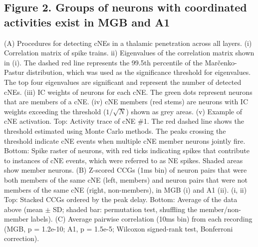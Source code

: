 \documentclass[11pt]{article}
\begin{document}
\subsection*{Figure 2. Groups of neurons with coordinated activities exist in MGB and A1}
(A) Procedures for detecting cNEs in a thalamic penetration across all layers. (i) Correlation matrix of spike trains. ii) Eigenvalues of the correlation matrix shown in (i). The dashed red line represents the 99.5th percentile of the Marčenko-Pastur distribution, which was used as the significance threshold for eigenvalues. The top four eigenvalues are significant and represent the number of detected cNEs. (iii) IC weights of neurons for each cNE. The green dots represent neurons that are members of a cNE. (iv) cNE members (red stems) are neurons with IC weights exceeding the threshold ($1/\sqrt{N}$) shown as grey areas. (v) Example of cNE activation. Top: Activity trace of cNE \#1. The red dashed line shows the threshold estimated using Monte Carlo methods. The peaks crossing the threshold indicate cNE events when multiple cNE member neurons jointly fire. Bottom: Spike raster of neurons, with red ticks indicating spikes that contribute to instances of cNE events, which were referred to as NE spikes. Shaded areas show member neurons.
(B) Z-scored CCGs (1ms bin) of neuron pairs that were both members of the same cNE (left, members) and neuron pairs that were not members of the same cNE (right, non-members), in MGB (i) and A1 (ii). (i, ii) Top: Stacked CCGs ordered by the peak delay. Bottom: Average of the data above (mean $\pm$ SD; shaded bar: permutation test, shuffling the member/non-member labels).
(C) Average pairwise correlation (10ms bin) from each recording (MGB, p = 1.2e-10; A1, p = 1.5e-5; Wilcoxon signed-rank test, Bonferroni correction).
\end{document}

